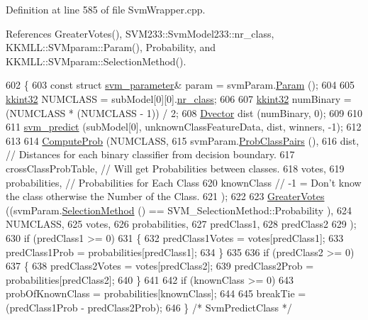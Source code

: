 Definition at line 585 of file Svm\+Wrapper.\+cpp.



References Greater\+Votes(), S\+V\+M233\+::\+Svm\+Model233\+::nr\+\_\+class, K\+K\+M\+L\+L\+::\+S\+V\+Mparam\+::\+Param(), Probability, and K\+K\+M\+L\+L\+::\+S\+V\+Mparam\+::\+Selection\+Method().


\begin{DoxyCode}
602 \{
603   \textcolor{keyword}{const} \textcolor{keyword}{struct }\hyperlink{struct_s_v_m233_1_1svm__parameter}{svm\_parameter}&  param = svmParam.\hyperlink{class_k_k_m_l_l_1_1_s_v_mparam_a8cfd90d197ffc05e10330d52320f61fe}{Param} ();
604 
605   \hyperlink{namespace_k_k_b_a8fa4952cc84fda1de4bec1fbdd8d5b1b}{kkint32}  NUMCLASS = subModel[0][0].\hyperlink{struct_s_v_m233_1_1_svm_model233_a55a9d2b4d87f50f14dfdcc1afc65b47b}{nr\_class};
606 
607   \hyperlink{namespace_k_k_b_a8fa4952cc84fda1de4bec1fbdd8d5b1b}{kkint32} numBinary = (NUMCLASS * (NUMCLASS - 1)) / 2;
608   \hyperlink{namespace_k_k_m_l_l_a4cdbae7e3075ec073ae28b98c8017a2c}{Dvector} dist (numBinary, 0);
609 
610 
611   \hyperlink{namespace_s_v_m233_a7f194ec68b77ae5069b5a601d3870371}{svm\_predict} (subModel[0], unknownClassFeatureData, dist, winners, -1);
612 
613 
614   \hyperlink{_svm_wrapper_8cpp_aaec82eeb18378f8dd1a66ed4f939d1f6}{ComputeProb}  (NUMCLASS,
615                 svmParam.\hyperlink{class_k_k_m_l_l_1_1_s_v_mparam_a4dace21b93df510f6cdf2d9722edef1a}{ProbClassPairs} (),
616                 dist,                   \textcolor{comment}{// Distances for each binary classifier from decision boundary.}
617                 crossClassProbTable,    \textcolor{comment}{// Will get Probabilities between classes.}
618                 votes,
619                 probabilities,          \textcolor{comment}{// Probabilities for Each Class}
620                 knownClass              \textcolor{comment}{// -1 = Don't know the class otherwise the Number of the Class.}
621                );
622 
623   \hyperlink{_svm_wrapper_8cpp_aadbaba3ac0546d7e1c01c0a41c58036a}{GreaterVotes} ((svmParam.\hyperlink{class_k_k_m_l_l_1_1_s_v_mparam_a084ed27759d9ef55a14b369da0ad7b93}{SelectionMethod} () == SVM\_SelectionMethod::Probability
      ),
624                 NUMCLASS,
625                 votes,
626                 probabilities,
627                 predClass1,
628                 predClass2
629                );
630   \textcolor{keywordflow}{if}  (predClass1 >= 0)
631   \{
632     predClass1Votes    = votes[predClass1];
633     predClass1Prob   = probabilities[predClass1];
634   \}
635 
636   \textcolor{keywordflow}{if}  (predClass2 >= 0)
637   \{
638     predClass2Votes    = votes[predClass2];
639     predClass2Prob   = probabilities[predClass2];
640   \}
641 
642   \textcolor{keywordflow}{if}  (knownClass >= 0)
643     probOfKnownClass   = probabilities[knownClass];
644 
645   breakTie = (predClass1Prob - predClass2Prob);
646 \}  \textcolor{comment}{/* SvmPredictClass */}
\end{DoxyCode}
